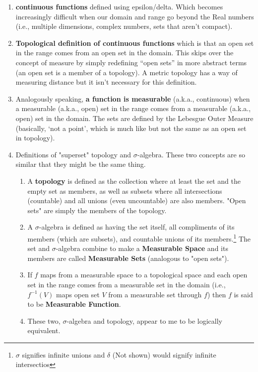 \documentclass[10pt,a4paper]{report}
\begin{document}
\begin{enumerate}
    \item  \textbf{continuous functions} defined using epsilon/delta.  Which becomes increasingly difficult when our domain and range go beyond the Real numbers (i.e., multiple dimensions, complex numbers, sets that aren’t compact).
    \item  \textbf{Topological definition of continuous functions} which is that an open set in the range comes from an open set in the domain.  This skips over the concept of measure by simply redefining “open sets” in more abstract terms (an open set is a member of a topology).  A metric topology has a way of measuring distance but it isn’t necessary for this definition.
    \item  Analogously speaking, \textbf{a function is measurable} (a.k.a., continuous) when a measurable (a.k.a., open) set in the range comes from a measurable (a.k.a., open) set in the domain.  The sets are defined by the Lebesgue Outer Measure (basically, ‘not a point’, which is much like but not the same as an open set in topology).
    \item Definitions of "superset" topology and $\sigma$-algebra.  These two concepts are so similar that they might be the same thing.
    \begin{enumerate}
    		\item A \textbf{topology} is defined as the collection where at least the set and the empty set as members, as well as subsets where all intersections (countable) and all unions (even uncountable) are also members.  "Open sets" are simply the members of the topology.
    		\item A $\sigma$-algebra is defined as having the set itself, all compliments of its members (which are subsets), and countable unions of its members.\footnote{$\sigma$ signifies infinite unions and $\delta$ (Not shown) would signify infinite intersectios} The set and $\sigma$-algebra combine to make a \textbf{Measurable Space} and its members are called \textbf{Measurable Sets} (analogous to "open sets"). 
    		\item If $f$ maps from a measurable space to a topological space and each open set in the range comes from a measurable set in the domain (i.e., $f^{-1}(V)$ maps open set $V$ from a measurable set through $f$) then $f$ is said to be \textbf{Measurable Function}.
    		\item These two, $\sigma$-algebra and topology, appear to me to be logically equivalent.
    		

\end{enumerate}
\end{enumerate}
\end{document}
